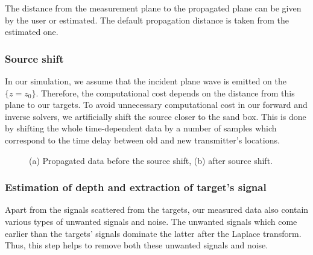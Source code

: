 \documentclass[a4paper,12pt]{article}
\begin{document}
The distance from the measurement plane to the propagated plane can be given by the user or estimated. The default propagation distance is taken from the estimated one. 


\subsubsection{Source shift}

In our simulation, we assume that the incident plane wave is emitted on the $\{z = z_0\}$. Therefore, the computational cost depends on the distance from this plane to our targets. To avoid unnecessary
computational cost in our forward and inverse solvers, we artificially shift
the source closer to the sand box. This is done by shifting the whole
time-dependent data by a number of samples which correspond to the time delay between old and new transmitter's locations. 



\begin{figure}[tph]
\centering
{} 
\caption{(a) Propagated data before the source shift, (b) after source shift.}
\label{fig:shift}
\end{figure}

\subsubsection{Estimation of depth and extraction of target's signal}
Apart from the
signals scattered from the targets, our measured data also contain various
types of unwanted signals and noise. The unwanted signals which come
earlier than the targets' signals dominate the latter after the Laplace
transform. Thus, this step helps to remove both these unwanted signals and noise. 
\end{document}
